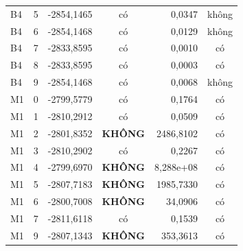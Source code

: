 \documentclass[11pt,a4paper]{article}
\begin{document}
\begin{longtable}{l c r c r c}
B4 & 5 & -2854{,}1465 & có & 0{,}0347 & không \\
B4 & 6 & -2854{,}1468 & có & 0{,}0129 & không \\
B4 & 7 & -2833{,}8595 & có & 0{,}0010 & có \\
B4 & 8 & -2833{,}8595 & có & 0{,}0003 & có \\
B4 & 9 & -2854{,}1468 & có & 0{,}0068 & không \\
\midrule
M1 & 0 & -2799{,}5779 & có & 0{,}1764 & có \\
M1 & 1 & -2810{,}2912 & có & 0{,}0509 & có \\
M1 & 2 & -2801{,}8352 & \textbf{KHÔNG} & 2486{,}8102 & có \\
M1 & 3 & -2810{,}2902 & có & 0{,}2267 & có \\
M1 & 4 & -2799{,}6970 & \textbf{KHÔNG} & 8{,}288e+08 & có \\
M1 & 5 & -2807{,}7183 & \textbf{KHÔNG} & 1985{,}7330 & có \\
M1 & 6 & -2800{,}7008 & \textbf{KHÔNG} & 34{,}0906 & có \\
M1 & 7 & -2811{,}6118 & có & 0{,}1539 & có \\
M1 & 9 & -2807{,}1343 & \textbf{KHÔNG} & 353{,}3613 & có \\
\midrule
\end{longtable}
\end{document}

